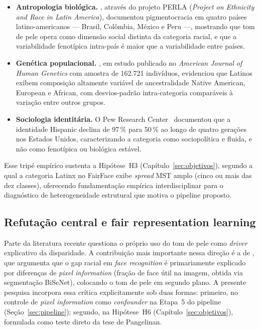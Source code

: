 \begin{itemize}
\item \textbf{Antropologia biológica.} , através do projeto PERLA (\emph{Project on Ethnicity and Race in Latin America}), documentou pigmentocracia em quatro países latino-americanos --- Brasil, Colômbia, México e Peru ---, mostrando que tom de pele opera como dimensão social distinta da categoria racial, e que a variabilidade fenotípica intra-país é maior que a variabilidade entre países.

\item \textbf{Genética populacional.} , em estudo publicado no \emph{American Journal of Human Genetics} com amostra de 162.721 indivíduos, evidenciou que Latinos exibem composição altamente variável de ancestralidade Native American, European e African, com desvios-padrão intra-categoria comparáveis à variação entre outros grupos.

\item \textbf{Sociologia identitária.} O Pew Research Center~\cite{lopez2017hispanic} documentou que a identidade Hispanic declina de 97\,\% para 50\,\% ao longo de quatro gerações nos Estados Unidos, caracterizando a categoria como sociopolítica e fluida, e não como fenotípica ou biológica estável.
\end{itemize}

Esse tripé empírico sustenta a Hipótese~H3 (Capítulo~\ref{sec:objetivos}), segundo a qual a categoria Latinx no FairFace exibe \emph{spread} MST amplo (cinco ou mais das dez classes), oferecendo fundamentação empírica interdisciplinar para o diagnóstico de heterogeneidade estrutural que motiva o pipeline proposto.

\subsection{Refutação central e fair representation learning}
\label{sec:rl_fairrep}

Parte da literatura recente questiona o próprio uso do tom de pele como \emph{driver} explicativo da disparidade. A contribuição mais importante nessa direção é a de , que argumenta que o gap racial em \emph{face recognition} é primariamente explicado por diferenças de \emph{pixel information} (fração de face útil na imagem, obtida via segmentação BiSeNet), colocando o tom de pele em segundo plano. A presente pesquisa incorpora essa crítica explicitamente sob duas formas: primeiro, no controle de \emph{pixel information} como \emph{confounder} na Etapa~5 do pipeline (Seção~\ref{sec:pipeline}); segundo, na Hipótese~H6 (Capítulo~\ref{sec:objetivos}), formulada como teste direto da tese de Pangelinan.

